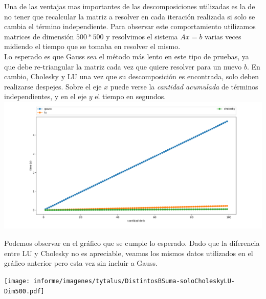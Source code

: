 Una de las ventajas mas importantes de las descomposiciones utilizadas es la de no tener que recalcular la matriz a resolver en cada iteración realizada si solo se cambia el término independiente. Para observar este comportamiento utilizamos matrices de dimensión $500*500$ y resolvimos el sistema $Ax = b$ varias veces midiendo el tiempo que se tomaba en resolver el mismo. \\

Lo esperado es que Gauss sea el método más lento en este tipo de pruebas, ya que debe re-triangular la matriz cada vez que quiere resolver para un nuevo $b$. En cambio, Cholesky y LU una vez que su descomposición es encontrada, solo deben realizarse despejes. Sobre el eje $x$ puede verse la \textit{cantidad acumulada} de términos independientes, y en el eje $y$ el tiempo en segundos. \\
\hspace*{-2cm} \includegraphics[scale=0.55]{informe/imagenes/tytalus/DistintosBSuma-Dim500.pdf}

Podemos observar en el gráfico que se cumple lo esperado. Dado que la diferencia entre LU y Cholesky no es apreciable, veamos los mismos datos utilizados en el gráfico anterior pero esta vez sin incluir a Gauss.

\hspace*{-2cm} \texttt{[image: informe/imagenes/tytalus/DistintosBSuma-soloCholeskyLU-Dim500.pdf]}




